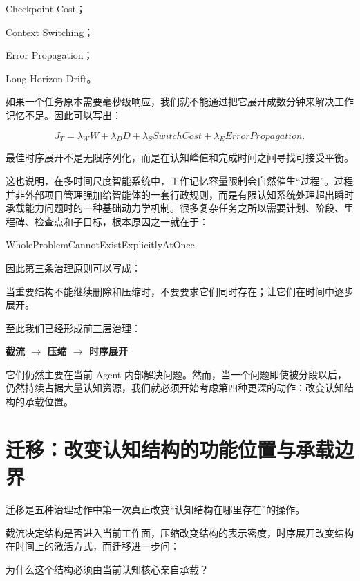 Checkpoint Cost；

Context Switching；

Error Propagation；

Long-Horizon Drift。

如果一个任务原本需要毫秒级响应，我们就不能通过把它展开成数分钟来解决工作记忆不足。因此可以写出：

\[
J_T
=
\lambda_W W
+
\lambda_D D
+
\lambda_S SwitchCost
+
\lambda_E ErrorPropagation.
\]

最佳时序展开不是无限序列化，而是在认知峰值和完成时间之间寻找可接受平衡。

这也说明，在多时间尺度智能系统中，工作记忆容量限制会自然催生“过程”。过程并非外部项目管理强加给智能体的一套行政规则，而是有限认知系统处理超出瞬时承载能力问题时的一种基础动力学机制。很多复杂任务之所以需要计划、阶段、里程碑、检查点和子目标，根本原因之一就在于：

\begin{statementbox}
WholeProblemCannotExistExplicitlyAtOnce.
\end{statementbox}

因此第三条治理原则可以写成：

\begin{proposition*}
当重要结构不能继续删除和压缩时，不要要求它们同时存在；让它们在时间中逐步展开。
\end{proposition*}

至此我们已经形成前三层治理：

\begin{statementbox}
\centering\bfseries
截流
$\longrightarrow$
压缩
$\longrightarrow$
时序展开
\end{statementbox}

它们仍然主要在当前 Agent 内部解决问题。然而，当一个问题即使被分段以后，仍然持续占据大量认知资源，我们就必须开始考虑第四种更深的动作：改变认知结构的承载位置。

\section{迁移：改变认知结构的功能位置与承载边界}

迁移是五种治理动作中第一次真正改变“认知结构在哪里存在”的操作。

截流决定结构是否进入当前工作面，压缩改变结构的表示密度，时序展开改变结构在时间上的激活方式，而迁移进一步问：

\begin{statementbox}
为什么这个结构必须由当前认知核心亲自承载？
\end{statementbox}


